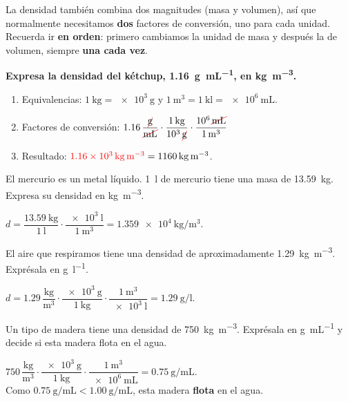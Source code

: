 La densidad también combina dos magnitudes (masa y volumen), así que normalmente necesitamos \textbf{dos} factores de conversión, uno para cada unidad. Recuerda ir \textbf{en orden}: primero cambiamos la unidad de masa y después la de volumen, siempre \textbf{una cada vez}.

\begin{example}
    \textbf{Expresa la densidad del kétchup, \qty{1.16}{\g\per\mL}, en \unit{\kg\per\cubic\metre}.}
    \begin{enumerate}[label=\numberballmDarkTeal]
        \item Equivalencias: \(\qty{1}{\kg} = \qty{e3}{\g}\) y \(\qty{1}{\cubic\metre} = \qty{1}{\kilo\litre} = \qty{e6}{\mL}\).
        \item Factores de conversión:
        \(
            \num{1.16}\,\dfrac{\cancelunit{\g}}{\cancelunit{\mL}} \cdot \dfrac{\qty{1}{\kg}}{\num{e3}\,\cancelunit{\g}} \cdot \dfrac{\num{e6}\,\cancelunit{\mL}}{\qty{1}{\cubic\m}}
        \)
        \item Resultado: \(\textcolor{red}{\qty{1.16e3}{\kg\per\cubic\metre}} = \qty{1160}{\kg\per\cubic\m}\).
    \end{enumerate}

\end{example}

\begin{exercise}
    El mercurio es un metal líquido. \qty{1}{\litre} de mercurio tiene una masa de \qty{13.59}{\kg}. Expresa su densidad en \unit{\kg\per\cubic\metre}.
    \begin{solu}
        \(d = \dfrac{\qty{13.59}{\kg}}{\qty{1}{\litre}} \cdot \dfrac{\qty{e3}{\litre}}{\qty{1}{\cubic\m}} = \qty{1.359e4}{\kg\per\cubic\metre}\).
    \end{solu}
\end{exercise}

\begin{exercise}
    El aire que respiramos tiene una densidad de aproximadamente \qty{1.29}{\kg\per\cubic\metre}. Exprésala en \unit{\g\per\litre}.
    \begin{solu}
        \(d = \num{1.29}\,\dfrac{\unit{\kg}}{\unit{\cubic\m}} \cdot \dfrac{\qty{e3}{\g}}{\qty{1}{\kg}} \cdot \dfrac{\qty{1}{\cubic\m}}{\qty{e3}{\litre}} = \qty{1.29}{\g\per\litre}\).
    \end{solu}
\end{exercise}

\begin{exercise}
    Un tipo de madera tiene una densidad de \qty{750}{\kg\per\cubic\metre}. Exprésala en \unit{\g\per\mL} y decide si esta madera flota en el agua.
    \begin{solu}
        \(\num{750}\,\dfrac{\unit{\kg}}{\unit{\cubic\m}} \cdot \dfrac{\qty{e3}{\g}}{\qty{1}{\kg}} \cdot \dfrac{\qty{1}{\cubic\m}}{\qty{e6}{\mL}} = \qty{0.75}{\g\per\mL}\). \\
        Como \(\qty{0.75}{\g\per\mL} < \qty{1.00}{\g\per\mL}\), esta madera \textbf{flota} en el agua.
    \end{solu}
\end{exercise}

